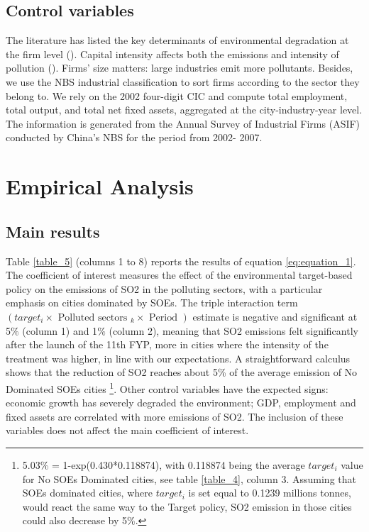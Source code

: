 \documentclass[12pt]{article}
\begin{document}
\subsection{Control variables}

The literature has listed the key determinants of environmental degradation at the firm level (\cite{Cole2003-ad,Cole2008-pj}). Capital intensity affects both the emissions and intensity of pollution (\cite{Hering2014-af,Andersen2017-wf}). Firms' size matters: large industries emit more pollutants. Besides, we use the NBS industrial classification to sort firms according to the sector they belong to. We rely on the 2002 four-digit CIC and compute total employment, total output, and total net fixed assets, aggregated at the city-industry-year level. The information is generated from the Annual Survey of Industrial Firms (ASIF) conducted by China's NBS for the period from 2002- 2007. 


\section{Empirical Analysis} \label{analysis} 


\subsection{Main results}



Table \ref{table_5} (columns 1 to 8) reports the results of equation \ref{eq:equation_1}. The coefficient of interest measures the effect of the environmental target-based policy on the emissions of SO2 in the polluting sectors, with a particular emphasis on cities dominated by SOEs. The triple interaction term $(target_{i} \times \text { Polluted sectors }_{k} \times \text { Period })$ estimate is negative and significant at 5$\%$  (column 1) and 1$\%$  (column 2), meaning that SO2 emissions felt significantly after the launch of the 11th FYP, more in cities where the intensity of the treatment was higher, in line with our expectations. A straightforward calculus shows that the reduction of SO2 reaches about 5\% of the average emission of No Dominated SOEs cities \footnote{5.03\% = 1-exp(0.430*0.118874), with 0.118874 being the average $target_i$ value for No SOEs Dominated cities, see table \ref{table_4}, column 3. Assuming that SOEs dominated cities, where $target_i$ is set equal to 0.1239 millions tonnes, would react the same way to the Target policy, SO2 emission in those cities could also decrease by 5\%.}. Other control variables have the expected signs: economic growth has severely degraded the environment; GDP, employment and fixed assets are correlated with more emissions of SO2. The inclusion of these variables does not affect the main coefficient of interest.
\end{document}

